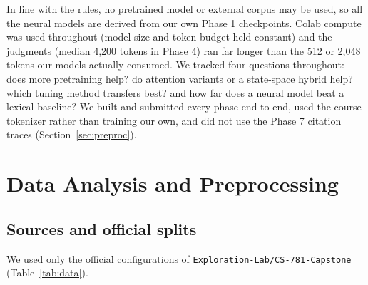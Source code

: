 \documentclass[11pt, oneside]{article}
\begin{document}
In line with the rules, no pretrained model or external corpus may be used, so all the neural models are derived from our own Phase 1 checkpoints. Colab compute was used throughout (model size and token budget held constant) and the judgments (median 4,200 tokens in Phase 4) ran far longer than the 512 or 2,048 tokens our models actually consumed. We tracked four questions throughout: does more pretraining help? do attention variants or a state-space hybrid help? which tuning method transfers best? and how far does a neural model beat a lexical baseline? We built and submitted every phase end to end, used the course tokenizer rather than training our own, and did not use the Phase 7 citation traces (Section~\ref{sec:preproc}).
\section{Data Analysis and Preprocessing}
\subsection{Sources and official splits}
We used only the official configurations of \texttt{Exploration-Lab/CS-781-Capstone} (Table~\ref{tab:data}).
\end{document}
